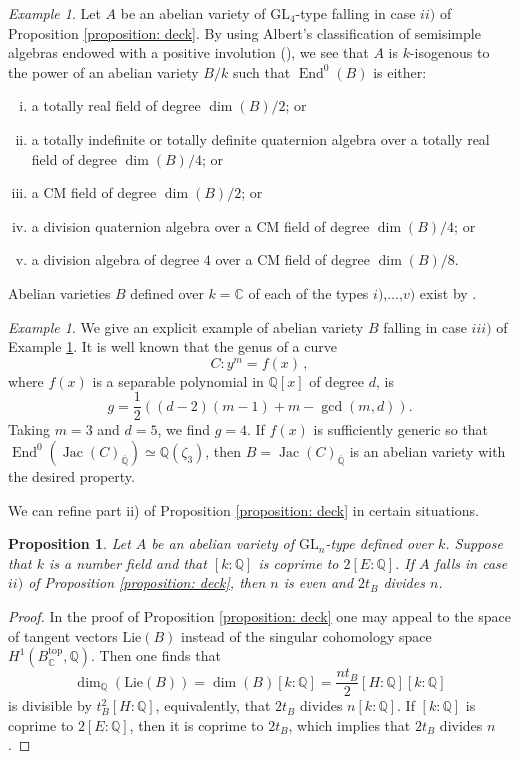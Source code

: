 \documentclass[oneside]{amsart}
\newtheorem{proposition}[theorem]{Proposition}
\theoremstyle{remark}
\newtheorem{example}[theorem]{Example}
\newcommand{\Q}{\mathbb Q}
\newcommand{\Qbar}{{\overline{\mathbb Q}}}
\newcommand{\C}{\mathbb C}
\newcommand{\GL}{\mathrm{GL}}
\newcommand{\End}{\operatorname{End}}
\newcommand{\Jac}{\operatorname{Jac}}
\newcommand{\Lie}{\mathrm{Lie}}
\numberwithin{equation}{section}
\begin{document}
\begin{example}\label{example: GL4Building}
Let $A$ be an abelian variety of $\GL_4$-type falling in case $ii)$ of Proposition \ref{proposition: deck}. By using Albert's classification of semisimple algebras endowed with a positive involution (\cite[\S21]{Mum74}), we see that $A$ is $k$-isogenous to the power of an abelian variety $B/k$ such that $\End^0(B)$ is either:
\begin{enumerate}[i)]
\item a totally real field of degree $\dim(B)/2$; or 
\item a totally indefinite or totally definite quaternion algebra over a totally real field of degree $\dim(B)/4$; or
\item a CM field of degree $\dim(B)/2$; or
\item a division quaternion algebra over a CM field of degree $\dim(B)/4$; or
\item a division algebra of degree $4$ over a CM field of degree $\dim(B)/8$.
\end{enumerate}
Abelian varieties $B$ defined over $k=\C$ of each of the types $i)$,$\dots$,$v)$ exist by \cite[Thm. 5]{Shi63}. 
\end{example}

\begin{example}
We give an explicit example of abelian variety $B$ falling in case $iii)$ of Example \ref{example: GL4Building}. It is well known that the genus of a curve
$$
C\colon y^m=f(x)\,,
$$
where $f(x)$ is a separable polynomial in $\Q[x]$ of degree $d$, is
$$
g=\frac{1}{2}((d-2)(m-1)+m-\gcd(m,d)).
$$ 
Taking $m=3$ and $d=5$, we find $g=4$. If $f(x)$ is sufficiently generic so that $\End^0(\Jac(C)_\Qbar)\simeq \Q(\zeta_3)$, then $B=\Jac(C)_{\Qbar}$ is an abelian variety with the desired property.
\end{example}




We can refine part ii) of Proposition \ref{proposition: deck} in certain situations.

\begin{proposition}\label{prop: k coprime E} Let $A$ be an abelian variety of $\GL_n$-type defined over $k$. Suppose that $k$ is a number field and that $[k\colon\Q]$ is coprime to $2[E\colon \Q]$. If $A$ falls in case $ii)$ of Proposition \ref{proposition: deck}, then $n$ is even and $2t_B$ divides $n$.
\end{proposition}
\begin{proof}
In the proof of Proposition \ref{proposition: deck} one may appeal to the space of tangent vectors $\Lie(B)$ instead of the singular cohomology space $H^1(B_{\C}^{\mathrm{top}},\Q)$. Then one finds that 
$$
\dim_\Q(\Lie(B))=\dim(B)[k:\Q]=\frac{nt_B}{2}[H:\Q][k:\Q]
$$ 
is divisible by $t^2_B[H:\Q]$, equivalently, that $2t_B$ divides $n[k:\Q]$. If $[k\colon\Q]$ is coprime to $2[E\colon \Q]$, then it is coprime to $2t_B$, which implies that $2t_B$ divides $n$.
\end{proof}
\end{document}
